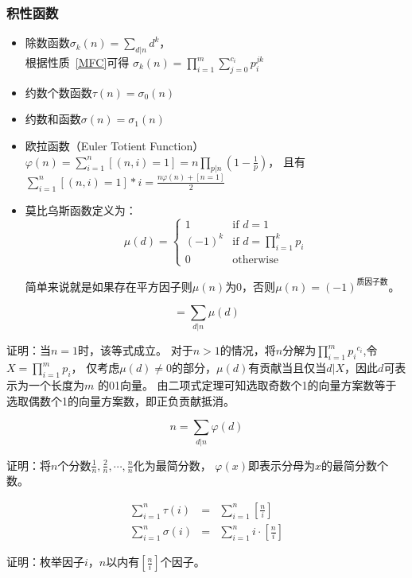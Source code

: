 \subsubsection{积性函数}
\begin{itemize}
	\item 除数函数$\displaystyle \sigma_k(n)=\sum_{d|n}{d^k}$，\\
	      根据性质~\ref{MFC}可得
	      $\displaystyle \sigma_k(n)=\prod_{i=1}^m{\sum_{j=0}^{c_i}{p_i^{jk}}}$
	\item 约数个数函数$\tau(n)=\sigma_0(n)$
	\item 约数和函数$\sigma(n)=\sigma_1(n)$
	\item {}
	      欧拉函数（Euler Totient Function）
	      $\displaystyle \varphi(n)=\sum_{i=1}^n{[(n,i)=1]}=n\prod_{p|n}{(1-\frac{1}{p})}$，
	      且有$\displaystyle \sum_{i=1}^n{[(n,i)=1]*i}=\frac{n\varphi(n)+[n=1]}{2}$
	\item {}
	      莫比乌斯函数定义为：
	      \begin{displaymath}
		      \mu(d)=
		      \left\{
		      \begin{array}{ll}
			      1      & \textrm{if $d=1$}                                \\
			      (-1)^k & \textrm{if $\displaystyle d=\prod_{i=1}^k{p_i}$} \\
			      0      & \textrm{otherwise}
		      \end{array}
		      \right.
	      \end{displaymath}

	      简单来说就是如果存在平方因子则$\mu(n)$为0，否则$\mu(n)=(-1)^\textrm{质因子数}$。
\end{itemize}
\begin{theorem}\label{MobiusT}
	\begin{displaymath}
		[n=1]=\sum_{d|n}{\mu(d)}
	\end{displaymath}
\end{theorem}
证明：当$n=1$时，该等式成立。
对于$n>1$的情况，将$n$分解为$\displaystyle \prod_{i=1}^m{{p_i}^{c_i}}$,令
$\displaystyle X=\prod_{i=1}^m{p_i}$，
仅考虑$\mu(d)\neq 0$的部分，$\mu(d)$有贡献当且仅当$d|X$，因此$d$可表示为一个长度为$m$
的01向量。
由二项式定理可知选取奇数个1的向量方案数等于选取偶数个1的向量方案数，即正负贡献抵消。
\begin{theorem}\label{PhiT}
	\begin{displaymath}
		n=\sum_{d|n}{\varphi(d)}
	\end{displaymath}
\end{theorem}
证明：将$n$个分数$\frac{1}{n},\frac{2}{n},\cdots,\frac{n}{n}$化为最简分数，
$\varphi(x)$即表示分母为$x$的最简分数个数。
\begin{theorem}\label{SigmaT}
	\begin{eqnarray*}
		\sum_{i=1}^n{\tau(i)}&=&\sum_{i=1}^n{[\frac{n}{i}]}\\
		\sum_{i=1}^n{\sigma(i)}&=&\sum_{i=1}^n{i\cdot[\frac{n}{i}]}
	\end{eqnarray*}
\end{theorem}
证明：枚举因子$i$，$n$以内有$[\frac{n}{i}]$个因子。
